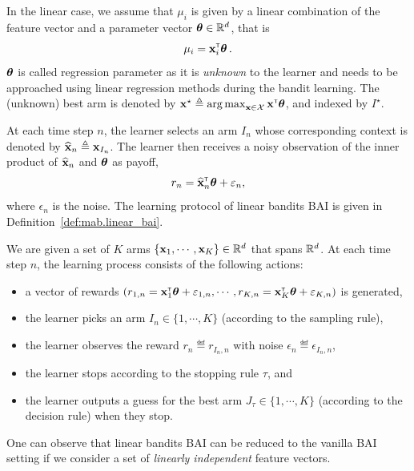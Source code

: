 In the linear case, we assume that $\mu_i$ is given by a linear combination of the feature vector and a parameter vector ${\boldsymbol \theta}\in\mathbb{R}^d$, that is 
\[
    \mu_i = {\bf x}_i^\mathsf{\scriptscriptstyle T}{\boldsymbol \theta}\,.
\]
${\boldsymbol \theta}$ is called regression parameter as it is \emph{unknown} to the learner and needs to be approached using linear regression methods during the bandit learning. The (unknown) best arm is denoted by ${\bf x}^\star\triangleq\operatorname*{arg\,max}_{{\bf x}\in\mathcal{X}}{\bf x}^\mathsf{\scriptscriptstyle T}{\boldsymbol \theta}$, and indexed by $I^\star$.

At each time step $n$, the learner selects an arm $I_n$ whose corresponding context is denoted by $\widehat{{\bf x}}_n\triangleq {\bf x}_{I_n}$. The learner then receives a noisy observation of the inner product of $\widehat{{\bf x}}_n$ and ${\boldsymbol \theta}$ as payoff,
\[
    r_n = \widehat{{\bf x}}_n^\mathsf{\scriptscriptstyle T}{\boldsymbol \theta} + \varepsilon_n,
\]
where $\epsilon_n$ is the noise. The learning protocol of linear bandits BAI is given in Definition~\ref{def:mab.linear_bai}.

\begin{definition}\label{def:mab.linear_bai}
\begin{leftbar}[defnbar]
	We are given a set of $K$ arms $\{{\bf x}_1,\cdots,{\bf x}_K\}\in\mathbb{R}^d$ that spans $\mathbb{R}^d$. At each time step $n$, the learning process consists of the following actions:
\begin{itemize}
	\item a vector of rewards $(r_{1,n} = {\bf x}_1^\mathsf{\scriptscriptstyle T}{\boldsymbol \theta}+\varepsilon_{1,n}, \cdots, r_{K,n} = {\bf x}_K^\mathsf{\scriptscriptstyle T}{\boldsymbol \theta}+\varepsilon_{K,n})$ is generated,
	\item the learner picks an arm $I_n \in \{1,\cdots,K\}$ (according to the sampling rule),
	\item the learner observes the reward $r_n \eqdef r_{I_n, n}$ with noise $\epsilon_n \eqdef \epsilon_{I_n,n}$,
	\item the learner stops according to the stopping rule $\tau$, and
	\item the learner outputs a guess for the best arm $J_\tau \in \{1,\cdots,K\}$ (according to the decision rule) when they stop.
\end{itemize}
\end{leftbar}
\end{definition}

\begin{remark}\label{remark:mab.reduction}
\begin{leftbar}[remarkbar]
    One can observe that linear bandits BAI can be reduced to the vanilla BAI setting if we consider a set of \emph{linearly independent} feature vectors.
\end{leftbar}
\end{remark}

